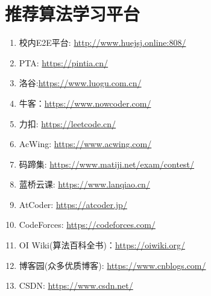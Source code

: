 \section{推荐算法学习平台}

\begin{enumerate}
	
	\item 校内E2E平台: \url{http://www.huejsj.online:808/}
	
	\item PTA: \url{https://pintia.cn/}
	
	\item 洛谷:\url{https://www.luogu.com.cn/}
	
	\item 牛客：\url{https://www.nowcoder.com/}
	
	\item 力扣: \url{https://leetcode.cn/}
	
	\item AcWing: \url{https://www.acwing.com/}

	\item 码蹄集: \url{https://www.matiji.net/exam/contest/}
	
	\item 蓝桥云课: \url{https://www.lanqiao.cn/}
	
	\item AtCoder: \url{https://atcoder.jp/}
	
	\item CodeForces: \url{https://codeforces.com/}
	
	\item OI Wiki(算法百科全书)：\url{https://oiwiki.org/}
	
	\item 博客园(众多优质博客): \url{https://www.cnblogs.com/}
	
	\item CSDN: \url{https://www.csdn.net/}
	
\end{enumerate}

\newpage
